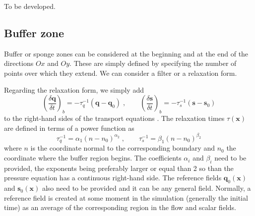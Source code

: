To be developed.

\subsection{Buffer zone}\label{sec:buffer}

Buffer or sponge zones can be considered at the beginning and at the end of the
directions $Ox$ and $Oy$. These are simply defined by specifying the number of
points over which they extend. We can consider a filter or a relaxation form.

Regarding the relaxation form, we simply add
\begin{equation}
\left(\frac{\delta \mathbf{q}}{\delta t}\right)_b=-\tau_q^{-1}(\mathbf{q}-\mathbf{q}_0)
\;,\qquad
\left(\frac{\delta \mathbf{s}}{\delta t}\right)_b=-\tau_s^{-1}(\mathbf{s}-\mathbf{s}_0)
\end{equation}
to the right-hand sides of the transport equations \citep{Hu:1996b}.  The
relaxation times $\tau(\mathbf{x})$ are defined in terms of a power function as
\begin{equation}
  \tau_q^{-1}=\alpha_1(n-n_0)^{\alpha_2} \;,\qquad
  \tau_s^{-1}=\beta_1(n-n_0)^{\beta_2}
\end{equation}
where $n$ is the coordinate normal to the corresponding boundary and $n_0$ the
coordinate where the buffer region begins. The coefficients $\alpha_i$ and
$\beta_i$ need to be provided, the exponents being preferably larger or equal
than 2 so than the pressure equation has a continuous right-hand side.  The
reference fields $\mathbf{q}_0(\mathbf{x})$ and $\mathbf{s}_0(\mathbf{x})$ also
need to be provided and it can be any general field. Normally, a reference field
is created at some moment in the simulation (generally the initial time) as an
average of the corresponding region in the flow and scalar fields.
